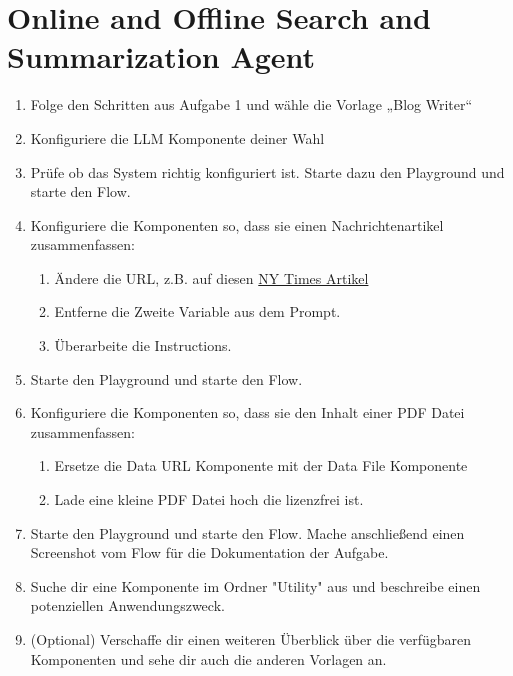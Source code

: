 \documentclass[12pt,ngerman]{AssignmentClass}
\begin{document}
\section{Online and Offline Search and Summarization Agent}
\begin{enumerate}
    \item Folge den Schritten aus Aufgabe 1 und wähle die  Vorlage „Blog Writer“ 
    \item Konfiguriere die LLM Komponente deiner Wahl
    \item Prüfe ob das System richtig konfiguriert ist. Starte dazu den Playground und starte den Flow. 
    \item Konfiguriere die Komponenten so, dass sie einen Nachrichtenartikel zusammenfassen: 
    \begin{enumerate}
        \item Ändere die URL, z.B. auf diesen \href{https://www.nytimes.com/interactive/2024/03/28/opinion/ai-political-bias.html?unlocked_article_code=1.g00.Ad4O.DBcJEwHGqnFM&smid=nytcore-ios-share&referringSource=articleShare}{NY Times Artikel}
        \item Entferne die Zweite Variable aus dem Prompt.
        \item Überarbeite die Instructions.
    \end{enumerate}
    \item Starte den Playground und starte den Flow. 
    \item Konfiguriere die Komponenten so, dass sie den Inhalt einer PDF Datei zusammenfassen: 
    \begin{enumerate}
        \item Ersetze die Data URL Komponente mit der Data File Komponente
        \item Lade eine kleine PDF Datei hoch die lizenzfrei ist. 
    \end{enumerate}
    \item Starte den Playground und starte den Flow. Mache anschließend einen Screenshot vom Flow für die Dokumentation der Aufgabe. 
    \item Suche dir eine Komponente im Ordner "Utility" aus und beschreibe einen potenziellen Anwendungszweck. 
    \item (Optional) Verschaffe dir einen weiteren Überblick über die verfügbaren Komponenten und sehe dir auch die anderen Vorlagen an. 
    
    
    
\end{enumerate}
\end{document}
